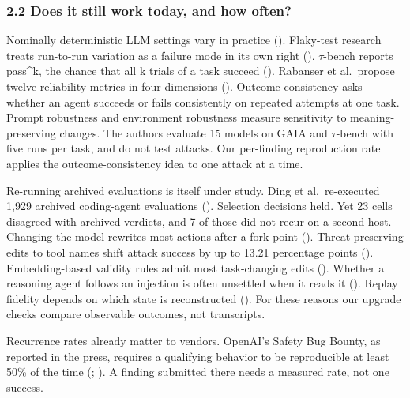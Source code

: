 \documentclass[
  american,
  10pt,
  a4paper,
]{article}
\begin{document}
\subsubsection{2.2 Does it still work today, and how
often?}\label{does-it-still-work-today-and-how-often}

Nominally deterministic LLM settings vary in practice
(). Flaky-test
research treats run-to-run variation as a failure mode in its own right
(). \(\tau\)-bench reports
pass\^{}k, the chance that all k trials of a task succeed
(). Rabanser et
al.~propose twelve reliability metrics in four dimensions
(). Outcome
consistency asks whether an agent succeeds or fails consistently on
repeated attempts at one task. Prompt robustness and environment
robustness measure sensitivity to meaning-preserving changes. The
authors evaluate 15 models on GAIA and \(\tau\)-bench with five runs per
task, and do not test attacks. Our per-finding reproduction rate applies
the outcome-consistency idea to one attack at a time.

Re-running archived evaluations is itself under study. Ding et
al.~re-executed 1,929 archived coding-agent evaluations
(). Selection
decisions held. Yet 23 cells disagreed with archived verdicts, and 7 of
those did not recur on a second host. Changing the model rewrites most
actions after a fork point
().
Threat-preserving edits to tool names shift attack success by up to
13.21 percentage points
().
Embedding-based validity rules admit most task-changing edits
().
Whether a reasoning agent follows an injection is often unsettled when
it reads it ().
Replay fidelity depends on which state is reconstructed
(). For these
reasons our upgrade checks compare observable outcomes, not transcripts.

Recurrence rates already matter to vendors. OpenAI's Safety Bug Bounty,
as reported in the press, requires a qualifying behavior to be
reproducible at least 50\% of the time
(;
). A finding submitted
there needs a measured rate, not one success.
\end{document}
